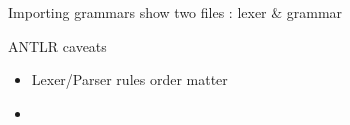\documentclass{beamer}
\begin{document}
\begin{frame}{Importing grammars}
	show two files : lexer \& grammar
\end{frame}

\begin{frame}{ANTLR caveats}
	\begin{itemize}
		\item Lexer/Parser rules order matter
		\item 
	\end{itemize}
\end{frame}

\end{document}
